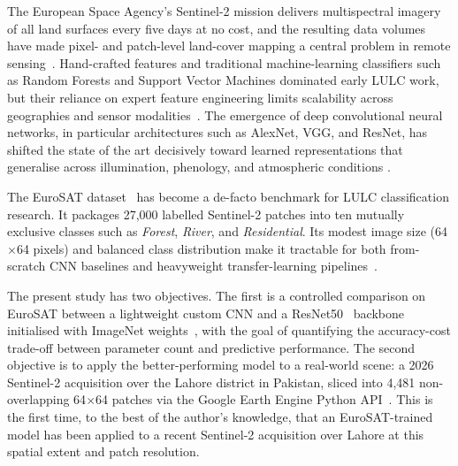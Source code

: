 \documentclass[conference]{IEEEtran}
\begin{document}
The European Space Agency's Sentinel-2 mission delivers multispectral
imagery of all land surfaces every five days at no cost, and the
resulting data volumes have made pixel- and patch-level land-cover
mapping a central problem in remote sensing~\cite{drusch2012sentinel}.
Hand-crafted features and traditional machine-learning classifiers
such as Random Forests and Support Vector Machines dominated early
LULC work, but their reliance on expert feature engineering limits
scalability across geographies and sensor modalities~\cite{xie2020sentinel}.
The emergence of deep convolutional neural networks, in particular
architectures such as AlexNet, VGG, and ResNet, has shifted the
state of the art decisively toward learned representations that
generalise across illumination, phenology, and atmospheric conditions
\cite{helber2019eurosat,krizhevsky2012alexnet,he2016resnet}.

The EuroSAT dataset~\cite{helber2017eurosat} has become a de-facto
benchmark for LULC classification research. It packages 27{,}000
labelled Sentinel-2 patches into ten mutually exclusive classes such
as \emph{Forest}, \emph{River}, and \emph{Residential}. Its modest
image size (64$\times$64 pixels) and balanced class distribution make
it tractable for both from-scratch CNN baselines and heavyweight
transfer-learning pipelines~\cite{helber2019eurosat,rao2020eurosat}.

The present study has two objectives. The first is a controlled
comparison on EuroSAT between a lightweight custom CNN and a
ResNet50~\cite{he2016resnet} backbone initialised with ImageNet
weights~\cite{russakovsky2015imagenet}, with the goal of quantifying
the accuracy-cost trade-off between parameter count and predictive
performance. The second objective is to apply the better-performing
model to a real-world scene: a 2026 Sentinel-2 acquisition over the
Lahore district in Pakistan, sliced into 4{,}481 non-overlapping
64$\times$64 patches via the Google Earth Engine Python
API~\cite{gorelick2017gee}. This is the first time, to the best of
the author's knowledge, that an EuroSAT-trained model has been
applied to a recent Sentinel-2 acquisition over Lahore at this
spatial extent and patch resolution.
\end{document}
